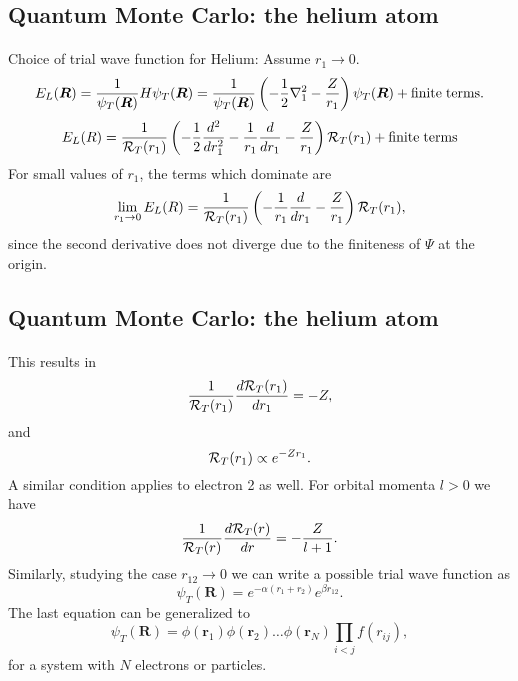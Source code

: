\documentclass[%
twoside,                 %
final,                   %
10pt]{article}
\begin{document}
\subsection*{Quantum Monte Carlo: the helium atom}

\paragraph{}
Choice of trial wave function for Helium:
Assume $r_1 \rightarrow 0$.
\[
   E_L(\bm{R})=\frac{1}{\psi_T(\bm{R})}H\psi_T(\bm{R})=
     \frac{1}{\psi_T(\bm{R})}\left(-\frac{1}{2}\nabla^2_1
     -\frac{Z}{r_1}\right)\psi_T(\bm{R}) + \mathrm{finite \hspace{0.1cm}terms}.
\]
\[ 
    E_L(R)=
    \frac{1}{{\cal R}_T(r_1)}\left(-\frac{1}{2}\frac{d^2}{dr_1^2}-
     \frac{1}{r_1}\frac{d}{dr_1}
     -\frac{Z}{r_1}\right){\cal R}_T(r_1) + \mathrm{finite\hspace{0.1cm} terms}
\]
For small values of $r_1$, the terms which dominate are
\[ 
    \lim_{r_1 \rightarrow 0}E_L(R)=
    \frac{1}{{\cal R}_T(r_1)}\left(-
     \frac{1}{r_1}\frac{d}{dr_1}
     -\frac{Z}{r_1}\right){\cal R}_T(r_1),
\]
since the second derivative does not diverge due to the finiteness of  $\Psi$ at the origin.






\subsection*{Quantum Monte Carlo: the helium atom}

\paragraph{}
This results in
\[
     \frac{1}{{\cal R}_T(r_1)}\frac{d {\cal R}_T(r_1)}{dr_1}=-Z,
\]
and
\[
   {\cal R}_T(r_1)\propto e^{-Zr_1}.
\]
A similar condition applies to electron 2 as well. 
For orbital momenta $l > 0$ we have 
\[
     \frac{1}{{\cal R}_T(r)}\frac{d {\cal R}_T(r)}{dr}=-\frac{Z}{l+1}.
\]
Similarly, studying the case $r_{12}\rightarrow 0$ we can write 
a possible trial wave function as
\[
   \psi_T(\bm{R})=e^{-\alpha(r_1+r_2)}e^{\beta r_{12}}.
    \label{eq:wavehelium2}
\]
The last equation can be generalized to
\[
   \psi_T(\bm{R})=\phi(\bm{r}_1)\phi(\bm{r}_2)\dots\phi(\bm{r}_N)
                   \prod_{i < j}f(r_{ij}),
\]
for a system with $N$ electrons or particles.
\end{document}
